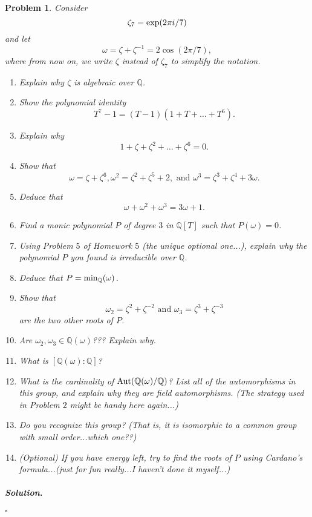 \documentclass[reqno]{amsart}
\theoremstyle{plain}
\newtheorem{problem}{Problem}
\theoremstyle{definition}
\newenvironment{solution}{\paragraph{\emph{Solution}.}}{\hfill$\square$}
\begin{document}
\begin{problem}
Consider 
$$\zeta_{7} = {\rm exp}(2 \pi i/7) $$
and let
$$\omega = \zeta + \zeta^{-1} = 2\cos(2\pi/7), $$
where from now on, we write $\zeta$ instead of $\zeta_{7}$ to simplify the notation.  
\begin{enumerate}
\item Explain why $\zeta$ is algebraic over $\mathbb{Q}$.
\item Show the polynomial identity
$$T^{7} - 1 = (T - 1)(1 + T + \ldots + T^{6}). $$
\item Explain why
$$1 + \zeta + \zeta^{2} + \ldots + \zeta^{6} = 0. $$
\item Show that
$$\omega = \zeta + \zeta^{6}, \omega^{2} = \zeta^{2} + \zeta^{5} + 2, \text{ and } \omega^{3} = \zeta^{3} + \zeta^{4} + 3\omega. $$
\item Deduce that
$$\omega + \omega^{2} + \omega^{3} = 3\omega + 1. $$
\item Find a monic polynomial $P$ of degree $3$ in $\mathbb{Q}[T]$ such that $P(\omega) = 0$.
\item Using Problem $5$ of Homework $5$ (the unique optional one...), explain why the polynomial $P$ you found is irreducible over $\mathbb{Q}$. 
\item Deduce that $P = {\rm min}_{\mathbb{Q}}(\omega)$.
\item Show that
$$\omega_{2} = \zeta^{2} + \zeta^{-2} \text{ and } \omega_{3} = \zeta^{3} + \zeta^{-3} $$
are the two other roots of $P$.
\item Are $\omega_{2}, \omega_{3} \in \mathbb{Q}(\omega)$???  Explain why.
\item What is $[\mathbb{Q}(\omega):\mathbb{Q}]$? 
\item What is the cardinality of ${\rm Aut}(\mathbb{Q}(\omega)/\mathbb{Q})$?  List all of the automorphisms in this group, and explain why they are field automorphisms.  (The strategy used in Problem $2$ might be handy here again...)
\item Do you recognize this group?  (That is, it is isomorphic to a common group with small order...which one??)
\item (Optional)  If you have energy left, try to find the roots of $P$ using Cardano's formula...(just for fun really...I haven't done it myself...)
\end{enumerate}
\end{problem}

\begin{solution}

\end{solution}
\end{document}
